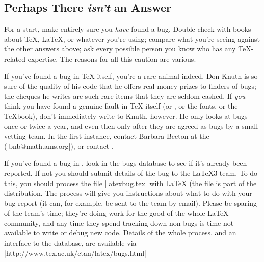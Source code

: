 \begin{changemargin}{-1cm}{-1cm}

%
\section{Perhaps There \emph{isn't} an Answer}

\htmlignore
\par
\endhtmlignore
{}
\htmlignore
\par
\endhtmlignore
%
\label{lastquestion}

For a start, make entirely sure you \emph{have} found a bug.
Double-check with books about \TeX{}, \LaTeX{}, or whatever you're using;
compare what you're seeing against the other answers above; ask every
possible person you know who has any \TeX{}-related expertise.
The reasons for all this caution are various.

If you've found a bug in \TeX{} itself, you're a rare animal indeed.
Don Knuth is so sure of the quality of his code that he offers real
money prizes to finders of bugs; the cheques he writes are
such rare items that they are seldom cashed. If \emph{you}
think you have found a genuine fault in \TeX{} itself (or \MF{}, or the
 fonts, or the \TeX{}book), don't immediately write to Knuth,
however. He only looks at bugs once or twice a year, and even then
only after they are agreed as bugs by a small vetting team. In the
first instance, contact Barbara Beeton at the 
(\Email|bnb@math.ams.org|), or contact .

If you've found a bug in \LaTeXe{}, look in the bugs database to see
if it's already been reported.  If not you should submit details of
the bug to the \LaTeX{}3 team.  To do this, you should
process the file \File|latexbug.tex| with \LaTeX{} (the file is part
of the \LaTeXe{} distribution.  The process will give you instructions
about what to do
with your bug report (it can, for example, be sent to the team by
email).  Please be sparing of the team's time; they're
doing work for the good of the whole \LaTeX{} community, and any time
they spend tracking down non-bugs is time not available to write or
debug new code.  Details of the whole process, and an interface to the
database, are available via
\URL|http://www.tex.ac.uk/ctan/latex/bugs.html|


\end{changemargin}
